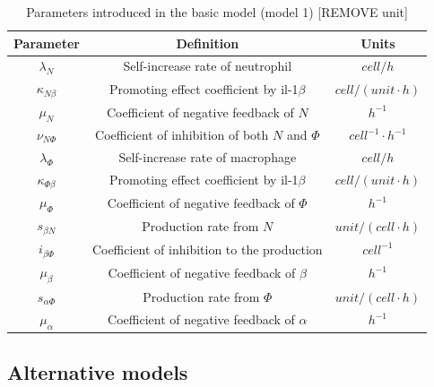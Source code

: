 \documentclass[12pt,a4paper]{report}
\begin{document}
\begin{table}[h!]
    \centering
    \begin{tabular}{|c c c|}
        \hline
        Parameter            & Definition                                       & Units                    \\ [0.5ex]
        \hline\hline
        $\lambda_N$          & Self-increase rate of neutrophil                 & $cell/h$                 \\
        $\kappa_{N\beta}$    & Promoting effect coefficient by il-1$\beta$      & $cell/(unit\cdotp h)$    \\
        $\mu_N$              & Coefficient of negative feedback of $N$          & $h^{-1}$                 \\
        $\nu_{N\Phi}$        & Coefficient of inhibition of both $N$ and $\Phi$ & $cell^{-1}\cdotp h^{-1}$ \\
        \hline
        $\lambda_\Phi$       & Self-increase rate of macrophage                 & $cell/h$                 \\
        $\kappa_{\Phi\beta}$ & Promoting effect coefficient by il-1$\beta$      & $cell/(unit\cdotp h)$    \\
        $\mu_\Phi$           & Coefficient of negative feedback of $\Phi$       & $h^{-1}$                 \\
        \hline
        $s_{\beta N}$        & Production rate from $N$                         & $unit/(cell\cdotp h)$    \\
        $i_{\beta\Phi}$      & Coefficient of inhibition to the production      & $cell^{-1}$              \\
        $\mu_\beta$          & Coefficient of negative feedback of $\beta$      & $h^{-1}$                 \\
        \hline
        $s_{\alpha\Phi}$     & Production rate from $\Phi$                      & $unit/(cell\cdotp h)$    \\
        $\mu_\alpha$         & Coefficient of negative feedback of $\alpha$     & $h^{-1}$                 \\
        \hline
    \end{tabular}
    \caption{Parameters introduced in the basic model (model 1) [REMOVE unit]}
    \label{table:m1}
\end{table}

\subsection{Alternative models}
\end{document}
